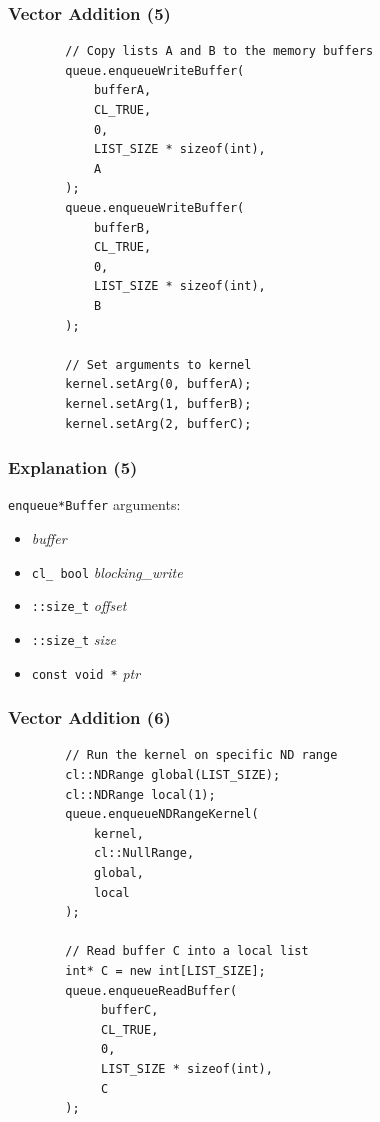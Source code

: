 \begin{frame}[fragile]
  \frametitle{Vector Addition (5)}

  \begin{lstlisting}
        // Copy lists A and B to the memory buffers
        queue.enqueueWriteBuffer(
            bufferA,
            CL_TRUE,
            0,
            LIST_SIZE * sizeof(int),
            A
        );
        queue.enqueueWriteBuffer(
            bufferB,
            CL_TRUE,
            0,
            LIST_SIZE * sizeof(int),
            B
        );
 
        // Set arguments to kernel
        kernel.setArg(0, bufferA);
        kernel.setArg(1, bufferB);
        kernel.setArg(2, bufferC);
  \end{lstlisting}

\end{frame}

\begin{frame}
  \frametitle{Explanation (5)}


  {\tt enqueue*Buffer} arguments:

  \begin{itemize}
    \item {\it buffer}
    \item {\tt cl\_ bool} {\it blocking\_write}
    \item {\tt ::size\_t} {\it offset}
    \item {\tt ::size\_t} {\it size}
    \item {\tt const void *} {\it ptr}
  \end{itemize}

\end{frame}

\begin{frame}[fragile]
  \frametitle{Vector Addition (6)}


  \begin{lstlisting} 
        // Run the kernel on specific ND range
        cl::NDRange global(LIST_SIZE);
        cl::NDRange local(1);
        queue.enqueueNDRangeKernel(
            kernel,
            cl::NullRange,
            global,
            local
        );
 
        // Read buffer C into a local list
        int* C = new int[LIST_SIZE];
        queue.enqueueReadBuffer(
             bufferC,
             CL_TRUE,
             0,
             LIST_SIZE * sizeof(int),
             C
        );
  \end{lstlisting}

\end{frame}

